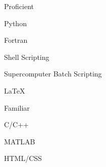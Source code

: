 \begin{cventries}

	\cventry
    {Proficient}
    {}
    {}
    {}
    {
      \begin{multicolcvitems}
        \item Python
        \item Fortran
        \item Shell Scripting        
        \item Supercomputer Batch Scripting
        \item LaTeX
      \end{multicolcvitems}
    }
    
    \vspace{-0.25cm}
    
	\cventry
	{Familiar}
	{}
	{}
	{}
	{
	\begin{multicolcvitems}
		\item C/C++
		\item MATLAB
		\item HTML/CSS
	\end{multicolcvitems}
    }

\end{cventries}
